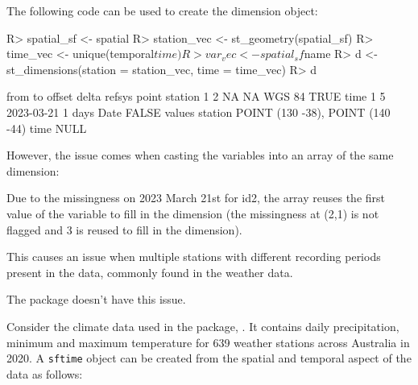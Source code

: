 \documentclass[
  shortnames]{jss}
\begin{document}
The following code can be used to create the dimension object:

\begin{CodeChunk}
\begin{CodeInput}
R> spatial_sf <- spatial %
R> station_vec <- st_geometry(spatial_sf)
R> time_vec <- unique(temporal$time)
R> var_vec <- spatial_sf$name
R> d <- st_dimensions(station = station_vec, time = time_vec)
R> d
\end{CodeInput}
\begin{CodeOutput}
        from to     offset  delta refsys point
station    1  2         NA     NA WGS 84  TRUE
time       1  5 2023-03-21 1 days   Date FALSE
                                  values
station POINT (130 -38), POINT (140 -44)
time                                NULL
\end{CodeOutput}
\end{CodeChunk}

However, the issue comes when casting the variables into an array of the same dimension:

\begin{CodeChunk}
\end{CodeChunk}

Due to the missingness on 2023 March 21st for id2, the array reuses the first value of the variable to fill in the dimension (the missingness at (2,1) is not flagged and 3 is reused to fill in the dimension).

This causes an issue when multiple stations with different recording periods present in the data, commonly found in the weather data.

The  package doesn't have this issue.

Consider the climate data used in the  package, . It contains daily precipitation, minimum and maximum temperature for 639 weather stations across Australia in 2020. A \texttt{sftime} object can be created from the spatial and temporal aspect of the data as follows:
\end{document}
